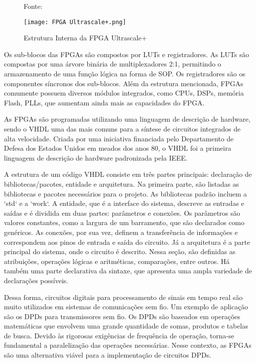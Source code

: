 \begin{figure}[H]
    \centering
    \captionsetup{justification=centering}
    \caption*{Fonte: \cite{Pedroni2010}}
    \texttt{[image: FPGA Ultrascale+.png]}
    \caption{Estrutura Interna da FPGA Ultrascale+}
    \label{fig:Ultrascale}
\end{figure}

Os sub-blocos das FPGAs são compostos por LUTs e registradores. As LUTs são compostas por uma árvore binária de multiplexadores 2:1, permitindo o armazenamento de uma função lógica na forma de SOP. Os registradores são os componentes síncronos dos sub-blocos. Além da estrutura mencionada, FPGAs comumente possuem diversos módulos integrados, como CPUs, DSPs, memória Flash, PLLs, que aumentam ainda mais as capacidades do FPGA.

As FPGAs são programadas utilizando uma linguagem de descrição de hardware, sendo o VHDL uma das mais comuns para a síntese de circuitos integrados de alta velocidade. Criada por uma iniciativa financiada pelo Departamento de Defesa dos Estados Unidos em meados dos anos 80, o VHDL foi a primeira linguagem de descrição de hardware padronizada pela IEEE.

A estrutura de um código VHDL consiste em três partes principais: declaração de bibliotecas/pacotes, entidade e arquitetura. Na primeira parte, são listadas as bibliotecas e pacotes necessários para o projeto. As bibliotecas padrão incluem a `std` e a `work`. A entidade, que é a interface do sistema, descreve as entradas e saídas e é dividida em duas partes: parâmetros e conexões. Os parâmetros são valores constantes, como a largura de um barramento, que são declarados como genéricos. As conexões, por sua vez, definem a transferência de informações e correspondem aos pinos de entrada e saída do circuito. Já a arquitetura é a parte principal do sistema, onde o circuito é descrito. Nessa seção, são definidas as atribuições, operações lógicas e aritméticas, comparações, entre outros. Há também uma parte declarativa da sintaxe, que apresenta uma ampla variedade de declarações possíveis.

Dessa forma, circuitos digitais para processamento de sinais em tempo real são muito utilizados em sistemas de comunicações sem fio. Um exemplo de aplicação são os DPDs para transmissores sem fio. Os DPDs são baseados em operações matemáticas que envolvem uma grande quantidade de somas, produtos e tabelas de busca. Devido às rigorosas exigências de frequência de operação, torna-se fundamental a paralelização das operações necessárias. Nesse contexto, as FPGAs são uma alternativa viável para a implementação de circuitos DPDs.


